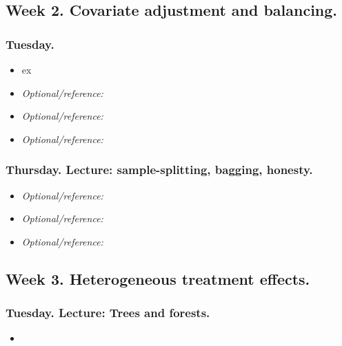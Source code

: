 \documentclass[letterpaper, 12pt, parskip=full,DIV=10]{scrartcl}
\begin{document}
\subsection*{Week 2. Covariate adjustment and balancing.}



\subsubsection*{Tuesday.}

\begin{itemize}
\item {} ex
\item \textit{Optional/reference:} 
\item \textit{Optional/reference:} 
\item \textit{Optional/reference:} 
\end{itemize}


\subsubsection*{Thursday. Lecture: sample-splitting, bagging, honesty.}

\begin{itemize}
\item  \textit{Optional/reference:}  
\item  \textit{Optional/reference:}  
\item \textit{Optional/reference:}  
\end{itemize}


\subsection*{Week 3. Heterogeneous treatment effects.}

\subsubsection*{Tuesday. Lecture: Trees and forests.}%

\begin{itemize}
\item {}
\end{itemize}
\end{document}
